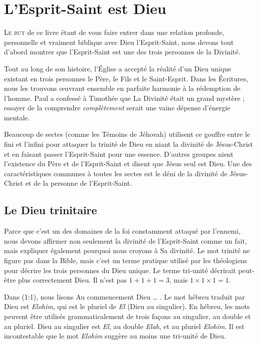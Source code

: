 \chapter{L'Esprit-Saint est Dieu}

\lettrine{L}{e but} de ce livre étant de vous faire entrer
 dans une relation profonde, personnelle et vraiment biblique avec
 Dieu l'Esprit-Saint, nous devons tout d'abord montrer que l'Esprit-Saint
 est une des trois personnes de la Divinité.

Tout au long de son histoire, l'Église a accepté la réalité d'un Dieu unique
 existant en trois personnes\frcolon{} le Père, le Fils et le Saint-Esprit.
 Dans les Écritures, nous les trouvons \oe{}uvrant ensemble en parfaite harmonie
 à la rédemption de l'homme.
 Paul a confessé à Timothée que La Divinité était un grand mystère ;
 essayer de la comprendre \emph{complètement} serait une vaine dépense
 d'énergie mentale.

Beaucoup de sectes (comme les Témoins de Jéhovah) utilisent
 ce gouffre entre le fini et l'infini pour attaquer la trinité de Dieu
 en niant la divinité de Jésus-Christ et en faisant passer l'Esprit-Saint
 pour une essence. D'autres groupes nient l'existence du Père et
 de l'Esprit-Saint et disent que Jésus seul est Dieu.
 Une des caractéristiques communes à toutes les sectes est le déni de la divinité
 de Jésus-Christ et de la personne de l'Esprit-Saint.

\section{Le Dieu trinitaire}

Parce que c'est un des domaines de la foi constamment attaqué par l'ennemi, nous devons
 affirmer non seulement la divinité de l'Esprit-Saint comme un fait,
 mais expliquer également pourquoi nous croyons à Sa divinité.
 Le mot \Og trinité \Fg{} ne figure pas dans la Bible, mais c'est un
 terme pratique utilisé par les théologiens pour décrire les trois personnes
 du Dieu unique.
 Le terme \Og tri-unité \Fg{} décrirait peut-être plus correctement Dieu.
 Il n'est pas $1 + 1 + 1 = 3$, mais $1 \times 1 \times 1 = 1$.

Dans (1:1), nous lisons\frcolon{}
 \Og Au commencement Dieu \dots{} \Fg{}.
 Le mot hébreu traduit par \Og Dieu \Fg{} est \emph{Elohim}, qui est
 le pluriel de \emph{El} (Dieu au singulier).
 En hébreu, les mots peuvent être utilisés grammaticalement de trois
 façons\frcolon{} au singulier, au \Og double \Fg{} et au pluriel.
 \Og Dieu \Fg{} au singulier est \emph{El}, au double \emph{Elah},
 et au pluriel \emph{Elohim}.
 Il est incontestable que le mot \emph{Elohim} suggère au moins
 une tri-unité de Dieu.

